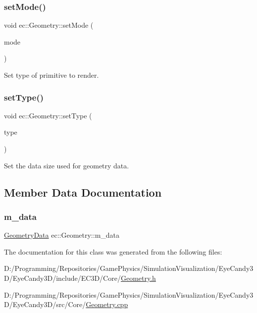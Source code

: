 \subsubsection{\texorpdfstring{set\+Mode()}{setMode()}}
{\footnotesize\ttfamily void ec\+::\+Geometry\+::set\+Mode (\begin{DoxyParamCaption}\item[{G\+Lenum}]{mode }\end{DoxyParamCaption})\hspace{0.3cm}{\ttfamily [protected]}}



Set type of primitive to render. 

\mbox{\label{classec_1_1_geometry_a12c3da280ff11e86a8b07d18a23e0880}} 
\subsubsection{\texorpdfstring{set\+Type()}{setType()}}
{\footnotesize\ttfamily void ec\+::\+Geometry\+::set\+Type (\begin{DoxyParamCaption}\item[{G\+Lenum}]{type }\end{DoxyParamCaption})\hspace{0.3cm}{\ttfamily [protected]}}



Set the data size used for geometry data. 



\subsection{Member Data Documentation}
\mbox{\label{classec_1_1_geometry_aeb72a472b242d92496f0283cfee17fac}} 
\subsubsection{\texorpdfstring{m\+\_\+data}{m\_data}}
{\footnotesize\ttfamily \mbox{\hyperlink{classec_1_1_geometry_data}{Geometry\+Data}} ec\+::\+Geometry\+::m\+\_\+data\hspace{0.3cm}{\ttfamily [protected]}}



The documentation for this class was generated from the following files\+:\begin{DoxyCompactItemize}
\item 
D\+:/\+Programming/\+Repositories/\+Game\+Physics/\+Simulation\+Visualization/\+Eye\+Candy3\+D/\+Eye\+Candy3\+D/include/\+E\+C3\+D/\+Core/\mbox{\hyperlink{_geometry_8h}{Geometry.\+h}}\item 
D\+:/\+Programming/\+Repositories/\+Game\+Physics/\+Simulation\+Visualization/\+Eye\+Candy3\+D/\+Eye\+Candy3\+D/src/\+Core/\mbox{\hyperlink{_geometry_8cpp}{Geometry.\+cpp}}\end{DoxyCompactItemize}
